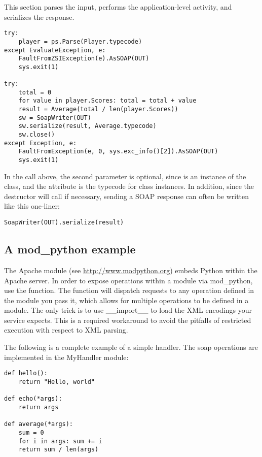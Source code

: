 This section parses the input, performs the application-level
activity, and serializes the response.
\begin{verbatim}
try:
    player = ps.Parse(Player.typecode)
except EvaluateException, e:
    FaultFromZSIException(e).AsSOAP(OUT)
    sys.exit(1)

try:
    total = 0
    for value in player.Scores: total = total + value
    result = Average(total / len(player.Scores))
    sw = SoapWriter(OUT)
    sw.serialize(result, Average.typecode)
    sw.close()
except Exception, e:
    FaultFromException(e, 0, sys.exc_info()[2]).AsSOAP(OUT)
    sys.exit(1)
\end{verbatim}

In the  call above, the second parameter is optional,
since  is an instance of the 
 class, and the  attribute is
the typecode for class instances.
In addition, since the  destructor will call 
if necessary, sending a SOAP response can often be written like
this one-liner:
\begin{verbatim}
SoapWriter(OUT).serialize(result)
\end{verbatim}


\subsection{A mod_python example}

The Apache module  (see
\url{http://www.modpython.org}) embeds Python within the Apache server.
In order to expose operations within a module via mod_python, use the 
 function.  The 
function will dispatch requests to any operation defined in the module you
pass it, which allows for multiple operations to be defined in a module.
The only trick is to use __import__ to load the XML encodings your service 
expects.  This is a required workaround to avoid the pitfalls of restricted
execution with respect to XML parsing.

The following is a complete example of a simple handler.  The soap operations
are implemented in the MyHandler module:

\begin{verbatim}
def hello():
    return "Hello, world"

def echo(*args):
    return args

def average(*args):
    sum = 0
    for i in args: sum += i
    return sum / len(args)
\end{verbatim}

